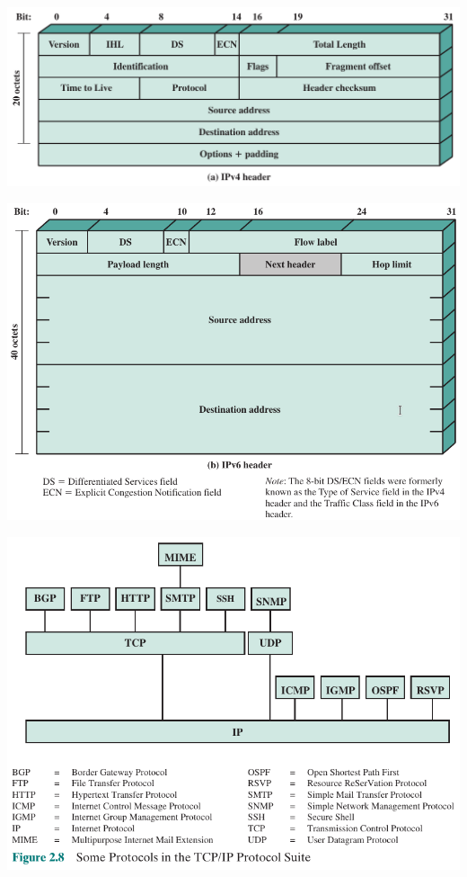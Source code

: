 \documentclass[pdflatex,compress]{beamer}
\begin{document}
\begin{frame}
	\begin{center}
		\includegraphics[width=\linewidth]{img/img07}
	\end{center}
\end{frame}

\begin{frame}
	\begin{center}
		\includegraphics[width=0.8\linewidth]{img/img08}
	\end{center}
\end{frame}

\begin{frame}
	\begin{center}
		\includegraphics[height=0.9\textheight]{img/img09}
	\end{center}
\end{frame}
\end{document}
